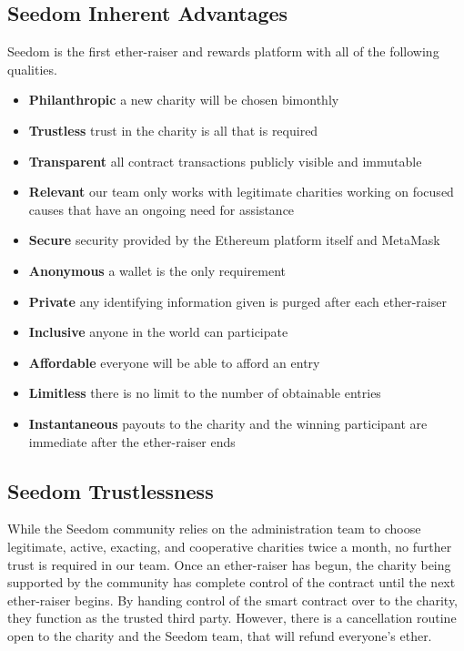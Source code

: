 \documentclass[11pt]{article}
\begin{document}
\subsection{Seedom Inherent Advantages}

Seedom is the first ether-raiser and rewards platform with all of the following qualities.

\begin{itemize}
\item{\textbf{Philanthropic} a new charity will be chosen bimonthly}
\item{\textbf{Trustless} trust in the charity is all that is required}
\item{\textbf{Transparent} all contract transactions publicly visible and immutable}
\item{\textbf{Relevant} our team only works with legitimate charities working on focused causes that have an ongoing need for assistance}
\item{\textbf{Secure} security provided by the Ethereum platform itself and MetaMask}
\item{\textbf{Anonymous} a wallet is the only requirement}
\item{\textbf{Private} any identifying information given is purged after each ether-raiser}
\item{\textbf{Inclusive} anyone in the world can participate}
\item{\textbf{Affordable} everyone will be able to afford an entry}
\item{\textbf{Limitless} there is no limit to the number of obtainable entries}
\item{\textbf{Instantaneous} payouts to the charity and the winning participant are immediate after the ether-raiser ends}
\end{itemize}

\subsection{Seedom Trustlessness}

While the Seedom community relies on the administration team to choose legitimate, active, exacting, and cooperative charities twice a month, no further trust is required in our team. Once an ether-raiser has begun, the charity being supported by the community has complete control of the contract until the next ether-raiser begins. By handing control of the smart contract over to the charity, they function as the trusted third party. However, there is a cancellation routine open to the charity and the Seedom team, that will refund everyone's ether.
\end{document}
